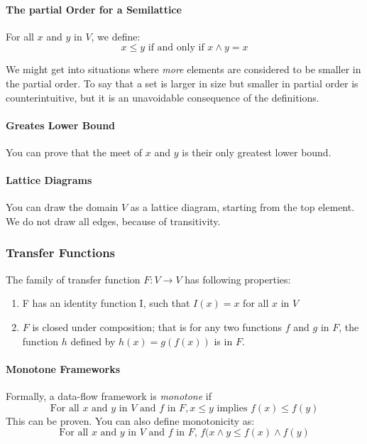 \documentclass{article}
\begin{document}
\paragraph{The partial Order for a Semilattice} %
\label{par:The partial Order for a Semilattice}
For all $x$ and $y$ in $V$, we define:
\begin{equation}
	x \le y \mbox{ if and only if } x \wedge y = x
\end{equation}

We might get into situations where \emph{more} elements are considered to be smaller in the partial order. To say that a set is larger in size but smaller in partial order is counterintuitive, but it is an unavoidable consequence of the definitions.

\paragraph{Greates Lower Bound} %
\label{par:Greates Lower Bound}
You can prove that the meet of $x$ and $y$ is their only greatest lower bound.

\paragraph{Lattice Diagrams} %
\label{par:Lattice Diagrams}
You can draw the domain $V$ as a lattice diagram, starting from the top element. We do not draw all edges, because of transitivity.


\subsubsection{Transfer Functions} %
\label{ssub:Transfer Functions}
The family of transfer function $F : V \to V$ has following properties:
\begin{enumerate}
	\item F has an identity function I, such that $I(x) = x$ for all $x$ in $V$
	\item $F$ is closed under composition; that is for any two functions $f$ and $g$ in $F$, the function $h$ defined by $h(x) = g(f(x))$ is in $F$.
\end{enumerate}

\paragraph{Monotone Frameworks} %
\label{par:Monotone Frameworks}
Formally, a data-flow framework is \emph{monotone} if
\begin{equation}
	\label{eq:monotone1}
	\mbox{For all } x \mbox{ and } y \mbox{ in } V \mbox{ and } f \mbox{ in } F, x \le y \mbox{ implies } f(x) \le f(y)
\end{equation}
This can be proven. You can also define monotonicity as:
\begin{equation}
	\mbox{For all $x$ and $y$ in $V$ and $f$ in $F$, } f(x \wedge y \le f(x) \wedge f(y)
\end{equation}
\end{document}
